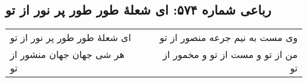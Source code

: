 \begin{center}
\section*{رباعی شماره ۵۷۴: ای شعلهٔ طور طور پر نور از تو}
\label{sec:sh574}
\begin{longtable}{l p{0.5cm} r}
ای شعلهٔ طور طور پر نور از تو
&&
وی مست به نیم جرعه منصور از تو
\\
هر شی جهان جهان منشور از تو
&&
من از تو و مست از تو و مخمور از تو
\\
\end{longtable}
\end{center}
